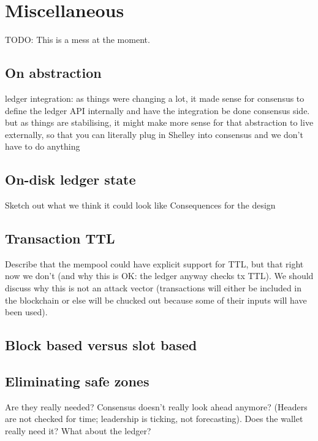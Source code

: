 \chapter{Miscellaneous}

TODO: This is a mess at the moment.

\section{On abstraction}

ledger integration: as things were changing a lot, it made sense for consensus to define the ledger API internally and have the integration be done consensus side. but as things are stabilising, it might make more sense for that abstraction to live externally, so that you can literally plug in Shelley into consensus and we don't have to do anything

\section{On-disk ledger state}

\duncan

Sketch out what we think it could look like
Consequences for the design

\section{Transaction TTL}
\label{future:ttl}

Describe that the mempool could have explicit support for TTL, but that right now we don't (and why this is OK: the ledger anyway checks tx TTL). We should discuss why this is not an attack vector (transactions will either be included in the blockchain or else will be chucked out because some of their inputs will have been used).

\section{Block based versus slot based}
\label{future:block-vs-slot}

\section{Eliminating safe zones}
\label{future:eliminating-safezones}

Are they really needed? Consensus doesn't really look ahead anymore?
(Headers are not checked for time; leadership is ticking, not forecasting).
Does the wallet really need it? What about the ledger?

